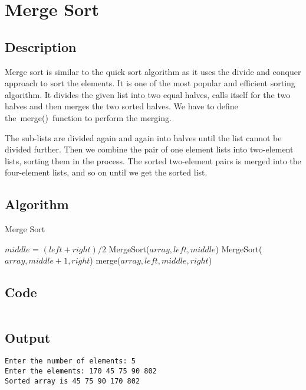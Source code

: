 \section{Merge Sort}

\subsection{Description}
Merge sort is similar to the quick sort algorithm as it uses the divide and conquer
approach to sort the elements. It is one of the most popular and efficient sorting
algorithm. It divides the given list into two equal halves, calls itself for the two halves
and then merges the two sorted halves. We have to define the merge() function to
perform the merging.

The sub-lists are divided again and again into halves until the list cannot be divided
further. Then we combine the pair of one element lists into two-element lists, sorting
them in the process. The sorted two-element pairs is merged into the four-element lists,
and so on until we get the sorted list.


\subsection{Algorithm}


\begin{algorithm}[H]
    \caption{Merge Sort}
    \begin{algorithmic}[1]
        \State $middle$ = $(left + right) / 2$
        \State MergeSort($array, left, middle$)
        \State MergeSort($array, middle + 1, right$)
        \State merge($array, left, middle, right$)
        \EndIf
        \EndProcedure
    \end{algorithmic}
\end{algorithm}

\subsection{Code}

\inputminted[fontsize=\footnotesize,bgcolor=bg,linenos,autogobble,frame=single,framerule=0.01pt,rulecolor=FSBorder,stripall,breaklines]{c++}{code/merge.cpp}
\subsection{Output}

\begin{lstlisting}[style=output]
Enter the number of elements: 5
Enter the elements: 170 45 75 90 802
Sorted array is 45 75 90 170 802
\end{lstlisting}
